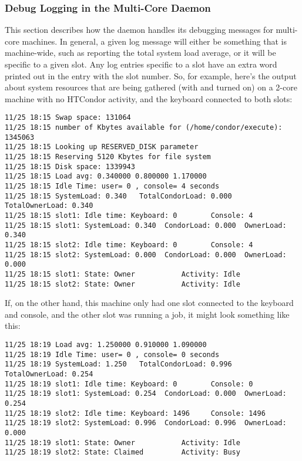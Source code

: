 \subsubsection{\label{sec:SMP-logging}
Debug Logging in the Multi-Core  Daemon}

This section describes how the  daemon
handles its debugging messages for multi-core machines.
In general, a given log message will either be something that is
machine-wide, 
such as reporting the total system load average,
or it will be specific to a given slot.
Any log entries specific to a slot have an extra word 
printed out in the entry with the slot number.  
So, for example, here's the output about system resources that are
being gathered (with  and  turned on) on
a 2-core machine with no HTCondor activity, and the keyboard connected to
both slots:
\begin{verbatim}
11/25 18:15 Swap space: 131064
11/25 18:15 number of Kbytes available for (/home/condor/execute): 1345063
11/25 18:15 Looking up RESERVED_DISK parameter
11/25 18:15 Reserving 5120 Kbytes for file system
11/25 18:15 Disk space: 1339943
11/25 18:15 Load avg: 0.340000 0.800000 1.170000
11/25 18:15 Idle Time: user= 0 , console= 4 seconds
11/25 18:15 SystemLoad: 0.340   TotalCondorLoad: 0.000  TotalOwnerLoad: 0.340
11/25 18:15 slot1: Idle time: Keyboard: 0        Console: 4
11/25 18:15 slot1: SystemLoad: 0.340  CondorLoad: 0.000  OwnerLoad: 0.340
11/25 18:15 slot2: Idle time: Keyboard: 0        Console: 4
11/25 18:15 slot2: SystemLoad: 0.000  CondorLoad: 0.000  OwnerLoad: 0.000
11/25 18:15 slot1: State: Owner           Activity: Idle
11/25 18:15 slot2: State: Owner           Activity: Idle
\end{verbatim}

If, on the other hand, this machine only had one slot
connected to the keyboard and console, and the other slot was running a
job, it might look something like this:
\begin{verbatim}
11/25 18:19 Load avg: 1.250000 0.910000 1.090000
11/25 18:19 Idle Time: user= 0 , console= 0 seconds
11/25 18:19 SystemLoad: 1.250   TotalCondorLoad: 0.996  TotalOwnerLoad: 0.254
11/25 18:19 slot1: Idle time: Keyboard: 0        Console: 0
11/25 18:19 slot1: SystemLoad: 0.254  CondorLoad: 0.000  OwnerLoad: 0.254
11/25 18:19 slot2: Idle time: Keyboard: 1496     Console: 1496
11/25 18:19 slot2: SystemLoad: 0.996  CondorLoad: 0.996  OwnerLoad: 0.000
11/25 18:19 slot1: State: Owner           Activity: Idle
11/25 18:19 slot2: State: Claimed         Activity: Busy
\end{verbatim}

